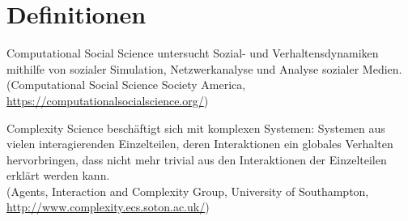 \section*{Definitionen}
\begin{frame}[label=computational_soc]
	\begin{beamerboxesrounded}{Computational Social Science} 
		untersucht Sozial- und Verhaltensdynamiken mithilfe von sozialer Simulation, Netzwerkanalyse und Analyse sozialer Medien.\\
		{\large(Computational Social Science Society America, \url{https://computationalsocialscience.org/})}
	\end{beamerboxesrounded}
\end{frame}

\begin{frame}[label=complexity_science]
	\begin{beamerboxesrounded}{Complexity Science} 
		beschäftigt sich mit komplexen Systemen: Systemen aus vielen interagierenden Einzelteilen, deren Interaktionen ein globales Verhalten hervorbringen, dass nicht mehr trivial aus den Interaktionen  der Einzelteilen erklärt werden kann.\\
		{\large(Agents, Interaction and Complexity Group, University of Southampton, \url{http://www.complexity.ecs.soton.ac.uk/})}
	\end{beamerboxesrounded}
\end{frame}
